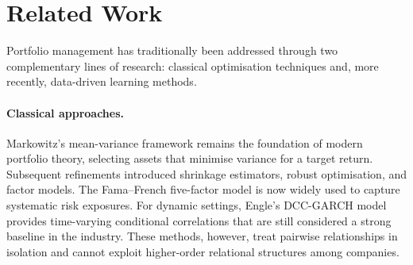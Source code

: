 \documentclass[runningheads]{llncs}
\begin{document}
\section{Related Work}\label{sec:related}

Portfolio management has traditionally been addressed through two complementary lines of research: classical optimisation techniques and, more recently, data-driven learning methods.

\paragraph{Classical approaches.}
Markowitz's mean-variance framework \cite{markowitz1952} remains the foundation of modern portfolio theory, selecting assets that minimise variance for a target return. Subsequent refinements introduced shrinkage estimators, robust optimisation, and factor models. The Fama--French five-factor model \cite{fama2015fivefactor} is now widely used to capture systematic risk exposures. For dynamic settings, Engle's DCC-GARCH model \cite{engle2002dynamic} provides time-varying conditional correlations that are still considered a strong baseline in the industry. These methods, however, treat pairwise relationships in isolation and cannot exploit higher-order relational structures among companies.

\end{document}
